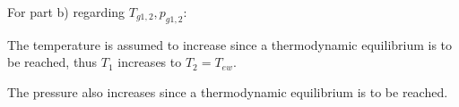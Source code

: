 For part b) regarding \( T_{g1,2}, p_{g1,2} \):

The temperature is assumed to increase since a thermodynamic equilibrium is to be reached, thus \( T_1 \) increases to \( T_2 = T_{ew} \).

The pressure also increases since a thermodynamic equilibrium is to be reached.